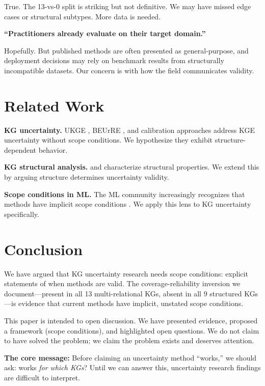 \documentclass{article}
\begin{document}
True. The 13-vs-0 split is striking but not definitive. We may have missed edge cases or structural subtypes. More data is needed.

\textbf{``Practitioners already evaluate on their target domain.''}

Hopefully. But published methods are often presented as general-purpose, and deployment decisions may rely on benchmark results from structurally incompatible datasets. Our concern is with how the field communicates validity.

\section{Related Work}

\textbf{KG uncertainty.} UKGE \citep{chen2019embedding}, BEUrRE \citep{chen2021probabilistic}, and calibration approaches \citep{guo2017calibration} address KGE uncertainty without scope conditions. We hypothesize they exhibit structure-dependent behavior.

\textbf{KG structural analysis.} \citet{akrami2020realistic} and \citet{rossi2021knowledge} characterize structural properties. We extend this by arguing structure determines uncertainty validity.

\textbf{Scope conditions in ML.} The ML community increasingly recognizes that methods have implicit scope conditions \citep{lake2018generalization}. We apply this lens to KG uncertainty specifically.

\section{Conclusion}

We have argued that KG uncertainty research needs scope conditions: explicit statements of when methods are valid. The coverage-reliability inversion we document---present in all 13 multi-relational KGs, absent in all 9 structured KGs---is evidence that current methods have implicit, unstated scope conditions.

This paper is intended to open discussion. We have presented evidence, proposed a framework (scope conditions), and highlighted open questions. We do not claim to have solved the problem; we claim the problem exists and deserves attention.

\textbf{The core message:} Before claiming an uncertainty method ``works,'' we should ask: works \emph{for which KGs}? Until we can answer this, uncertainty research findings are difficult to interpret.



\end{document}
